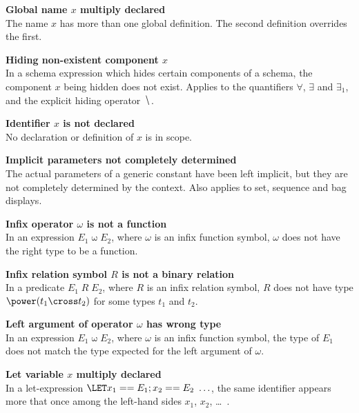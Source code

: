 {{{{{{\begin{trivlist}
\item[]{\bf Global name $x$ multiply declared}\\
        The name $x$ has more than one global definition. The second
        definition overrides the first. 

\item[]{\bf Hiding non-existent component $x$}\\
        In a schema expression which hides certain components of a
        schema, the component $x$ being hidden does not exist.
        Applies to the quantifiers $\forall$, $\exists$ and
        $\exists_1$, and the explicit hiding operator $\hide$.

\item[]{\bf Identifier $x$ is not declared}\\
        No declaration or definition of $x$ is in scope.

\item[]{\bf Implicit parameters not completely determined}\\
        The actual parameters of a generic constant have been left
        implicit, but they are not completely determined by the
        context. Also applies to set, sequence and bag displays.

\item[]{\bf Infix operator $\omega$ is not a function}\\ 
        In an expression $E_1 \mathbin{\omega} E_2$, where $\omega$
        is an infix function symbol, $\omega$ does not have the
        right type to be a function. 

\item[]{\bf Infix relation symbol $R$ is not a binary relation}\\
        In a predicate $E_1\;R\;E_2$, where $R$ is an infix relation
        symbol, $R$ does not have type $\power (t_1 \cross t_2)$ for
        some types $t_1$ and $t_2$.  

\item[]{\bf Left argument of operator $\omega$ has wrong type}\\
        In an expression $E_1 \mathbin{\omega} E_2$, where $\omega$
        is an infix function symbol, the type of $E_1$ does not
        match the type expected for the left argument of $\omega$.

\item[]{\bf Let variable $x$ multiply declared}\\
        In a let-expression $\LET x_1 == E_1; x_2 == E_2~\ldots$,
        the same identifier appears more that once among the
        left-hand sides $x_1$, $x_2$, \dots~.  


\end{trivlist}}}}}}}
